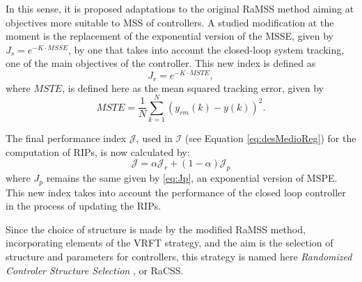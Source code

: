 In this sense, it is proposed adaptations to the original RaMSS method aiming at objectives more suitable to MSS of controllers. A studied modification at the moment is the replacement of the exponential version of the MSSE, given by $J_s= e^{-K\cdot MSSE}$, by one that takes into account the closed-loop system tracking, one of the main objectives of the controller. This new index is defined as
\begin{equation}
  J_r=e^{-K\cdot MSTE},
  \label{eq:Jr}
\end{equation}
where $MSTE$, is defined here as the mean squared tracking error, given by
\begin{equation}
  MSTE = \frac{1}{N}\sum_{k=1}^{N} (y_{rm}(k)-y(k))^2.
  \label{eq:MSTE}
\end{equation} 

The final performance index $\mathcal{J}$, used in $\mathcal{I}$ (see Equation \ref{eq:desMedioReg}) for the computation of RIPs, is now calculated by:
\begin{equation}
  \mathcal{J} = \alpha \mathcal{J}_r + (1-\alpha)\mathcal{J}_p
\label{eq:Jracss}
\end{equation}
where $J_p$ remains the same given by \eqref{eq:Jp}, an exponential version of MSPE. This new index takes into account the performance of the closed loop controller in the process of updating the RIPs.

Since the choice of structure is made by the modified RaMSS method, incorporating elements of the VRFT strategy, and the aim is the selection of structure and parameters for controllers, this strategy is named here \textit{Randomized Controler Structure Selection }, or RaCSS.

